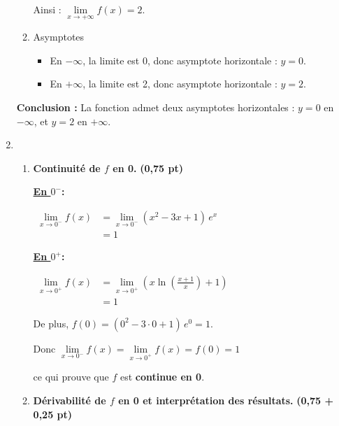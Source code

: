\documentclass[12pt,a4paper]{article}
\begin{document}
\begin{enumerate}
\begin{enumerate}
                    Ainsi : \(\lim\limits_{x \to +\infty} f(x) = 2.\)
              \item Asymptotes
                    \begin{itemize}
                        \item En \( -\infty \), la limite est 0, donc asymptote horizontale : \( y = 0 \).
                        \item En \( +\infty \), la limite est 2, donc asymptote horizontale : \( y = 2 \).
                    \end{itemize}
          \end{enumerate}
          \textbf{Conclusion :} La fonction admet deux asymptotes horizontales : \( y = 0 \) en \( -\infty \), et \( y = 2 \) en \( +\infty \).
    \item
          \begin{enumerate}
              \item \textbf{Continuité de \( f \) en 0.} \hfill \textbf{(0,75 pt)}

                    \textbf{\underline{En $0^-$}:}

                    \(
                    \begin{aligned}
                        \lim\limits_{x \to 0^-} f(x) & = \lim\limits_{x \to 0^-} (x^2 - 3x + 1)\, e^x \\
                                                     & = 1
                    \end{aligned}
                    \)

                    \textbf{\underline{En $0^+$}:}

                    \(
                    \begin{aligned}
                        \lim\limits_{x \to 0^+} f(x) & = \lim\limits_{x \to 0^+} \left( x \ln\left( \frac{x+1}{x} \right) + 1 \right) \\
                                                     & = 1
                    \end{aligned}
                    \)

                    De plus, \(f(0) = (0^2 - 3 \cdot 0 + 1)\, e^0 = 1.\)

                    Donc \( \lim\limits_{x \to 0^-} f(x) = \lim\limits_{x \to 0^+} f(x) = f(0) = 1\)

                    ce qui prouve que \( f \) est \textbf{continue en 0}.

              \item \textbf{Dérivabilité de \( f \) en 0 et interprétation des résultats.} \hfill \textbf{(0,75 + 0,25 pt)}


\end{enumerate}
\end{enumerate}
\end{document}
